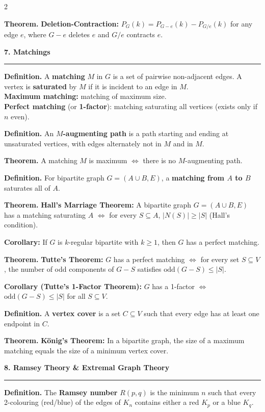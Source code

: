 \documentclass[8pt,landscape,a4paper]{extarticle}
\newcommand{\thm}[1]{\begin{mdframed}[style=theorembox]\textbf{Theorem.} #1\end{mdframed}}
\newcommand{\defn}[1]{\begin{mdframed}[style=defbox]\textbf{Definition.} #1\end{mdframed}}
\newcommand{\heading}[1]{\vspace{1pt}\noindent\textbf{\large #1}\vspace{1pt}\hrule\vspace{2pt}}
\begin{document}
\begin{multicols}{2}
\thm{\textbf{Deletion-Contraction:} $P_G(k) = P_{G-e}(k) - P_{G/e}(k)$ for any edge $e$, where $G-e$ deletes $e$ and $G/e$ contracts $e$.}

\heading{7. Matchings}

\defn{A \textbf{matching} $M$ in $G$ is a set of pairwise non-adjacent edges. A vertex is \textbf{saturated} by $M$ if it is incident to an edge in $M$.\\
\textbf{Maximum matching:} matching of maximum size.\\
\textbf{Perfect matching} (or \textbf{1-factor}): matching saturating all vertices (exists only if $n$ even).}

\defn{An \textbf{$M$-augmenting path} is a path starting and ending at unsaturated vertices, with edges alternately not in $M$ and in $M$.}

\thm{A matching $M$ is maximum $\iff$ there is no $M$-augmenting path.}

\defn{For bipartite graph $G = (A \cup B, E)$, a \textbf{matching from $A$ to $B$} saturates all of $A$.}

\thm{\textbf{Hall's Marriage Theorem:} A bipartite graph $G = (A \cup B, E)$ has a matching saturating $A$ $\iff$ for every $S \subseteq A$, $|N(S)| \geq |S|$ (Hall's condition).}

\textbf{Corollary:} If $G$ is $k$-regular bipartite with $k \geq 1$, then $G$ has a perfect matching.

\thm{\textbf{Tutte's Theorem:} $G$ has a perfect matching $\iff$ for every set $S \subseteq V$, the number of odd components of $G - S$ satisfies $\text{odd}(G-S) \leq |S|$.}

\textbf{Corollary (Tutte's 1-Factor Theorem):} $G$ has a 1-factor $\iff$ $\text{odd}(G-S) \leq |S|$ for all $S \subseteq V$.

\defn{A \textbf{vertex cover} is a set $C \subseteq V$ such that every edge has at least one endpoint in $C$.}

\thm{\textbf{König's Theorem:} In a bipartite graph, the size of a maximum matching equals the size of a minimum vertex cover.}

\heading{8. Ramsey Theory \& Extremal Graph Theory}

\defn{The \textbf{Ramsey number} $R(p,q)$ is the minimum $n$ such that every 2-colouring (red/blue) of the edges of $K_n$ contains either a red $K_p$ or a blue $K_q$.}


\end{multicols}
\end{document}

